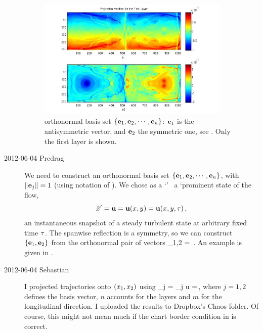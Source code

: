 \begin{description}
\begin{figure}
\begin{center}
  \includegraphics[width=0.9\textwidth]{Projectionvectors}
\end{center}
  \caption{orthonormal basis set
$\{{\bf e}_1, {\bf e}_2, \cdots, {\bf e}_n\}$: ${\bf e}_1$ is
  the antisymmetric vector, and ${\bf e}_2$ the symmetric one, see
  . Only the first layer is shown.
  }\label{Projectionvectors}
\end{figure}

\item[2012-06-04 Predrag]
We need to construct an orthonormal basis set
$\{{\bf e}_1, {\bf e}_2, \cdots, {\bf e}_n\}$, with $\|{{\bf e}_j}\|=1$
(using notation of ).
We chose as a `\template' \slicep\ a `prominent state of the flow,
\[
{\hat{x}'} = {\bf u} = {\bf u}(x,y) = {\bf u}(x,y,\tau) \,,
\]
an instantaneous snapshot of a steady turbulent state at arbitrary fixed
time $\tau$.
The spanwise reflection is a symmetry, so we can construct $\{{\bf e}_1,
{\bf e}_2\}$ from the orthonormal pair of vectors
\beq
\be_{1,2} = 
\,.
An example is given in .

\item[2012-06-04 Sebastian]
I projected
trajectories onto $(x_1, x_2)$ using
\beq
\ssp_j = \be_{j} \cdot u =\Re \left[\sum_{n=1}^2\sum_{l=0}^{M-1}\sum_{k=0}^{N/2} u_{l,k,n} e^i_{l,k,n} \right]
\,,
where $j=1,2$ defines the basis vector, $n$ accounts for the layers and
$m$ for the longitudinal direction. I uploaded the results to Dropbox's
Chaos folder. Of course, this might not mean much if the chart border
condition in  is correct.


\end{description}
